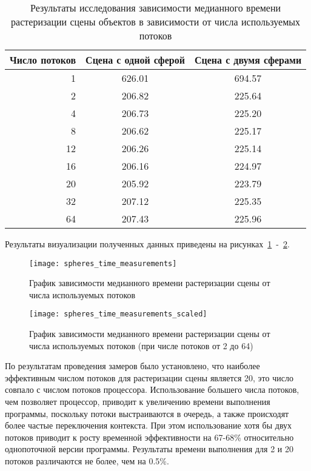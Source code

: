 \begin{table}[H]
	\begin{center}
		\begin{threeparttable}
			\centering
			\captionsetup{justification=raggedright,singlelinecheck=off}
			\caption{\label{tb:meas}Результаты исследования зависимости медианного времени растеризации сцены объектов в зависимости от числа используемых потоков}
			\begin{tabular}{| r | c | c |} \hline
				Число потоков & Сцена с одной сферой & Сцена с двумя сферами \\ \hline
				1 & 626.01 & 694.57 \\ \hline
				2 & 206.82 & 225.64 \\ \hline
				4 & 206.73 & 225.20 \\ \hline
				8 & 206.62 & 225.17 \\ \hline
				12 & 206.26 & 225.14 \\ \hline
				16 & 206.16 & 224.97 \\ \hline
				20 & 205.92 & 223.79 \\ \hline
				32 & 207.12 & 225.35 \\ \hline
				64 & 207.43 & 225.96 \\ \hline
			\end{tabular}
		\end{threeparttable}
	\end{center}
\end{table}


Результаты визуализации полученных данных приведены на рисунках~\ref{fig:meas}~-~\ref{fig:meas_scaled}.
\begin{figure}[H]
	\centering
	\texttt{[image: spheres\_time\_measurements]}
	\caption{График зависимости медианного времени растеризации сцены от числа используемых потоков}
	\label{fig:meas}
\end{figure}

\begin{figure}[H]
	\centering
	\texttt{[image: spheres\_time\_measurements\_scaled]}
	\caption{График зависимости медианного времени растеризации сцены от числа используемых потоков (при числе потоков от 2 до 64)}
	\label{fig:meas_scaled}
\end{figure}

По результатам проведения замеров было установлено, что наиболее эффективным числом потоков для растеризации сцены является 20, это число совпало с числом потоков процессора. Использование большего числа потоков, чем позволяет процессор, приводит к увеличению времени выполнения программы, поскольку потоки выстраиваются в очередь, а также происходят более частые переключения контекста. При этом использование хотя бы двух потоков приводит к росту временной эффективности на 67-68\% относительно однопоточной версии программы. Результаты времени выполнения для 2 и 20 потоков различаются не более, чем на 0.5\%.


